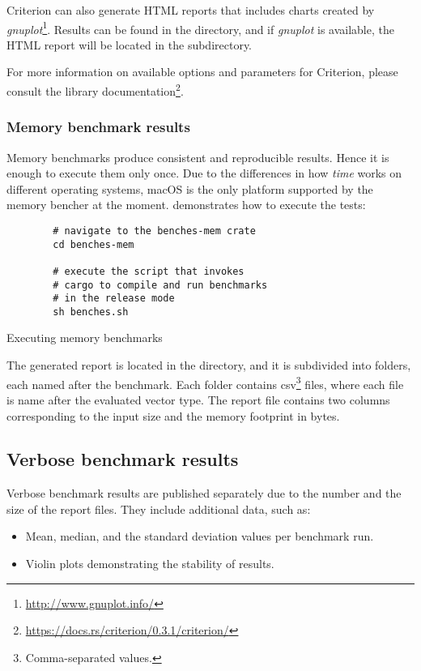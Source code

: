 Criterion can also generate HTML reports that includes charts created by \emph{gnuplot}\footnote{\url{http://www.gnuplot.info/}}. Results can be found in the  directory, and if \emph{gnuplot} is available, the HTML report will be located in the  subdirectory.

For more information on available options and parameters for Criterion, please consult the library documentation\footnote{\url{https://docs.rs/criterion/0.3.1/criterion/}}.

\subsubsection*{Memory benchmark results}
Memory benchmarks produce consistent and reproducible results. Hence it is enough to execute them only once. Due to the differences in how \emph{time} works on different operating systems, macOS is the only platform supported by the memory bencher at the moment.  demonstrates how to execute the tests:

\begin{listing}[!htbp]

    \centering
    \begin{verbatim}
        # navigate to the benches-mem crate
        cd benches-mem

        # execute the script that invokes
        # cargo to compile and run benchmarks
        # in the release mode
        sh benches.sh
    \end{verbatim}

    \caption{Executing memory benchmarks}
    \label{lst:memory-benches}
\end{listing}

The generated report is located in the  directory, and it is subdivided into folders, each named after the benchmark. Each folder contains csv\footnote{Comma-separated values.} files, where each file is name after the evaluated vector type. The report file contains two columns corresponding to the input size and the memory footprint in bytes.

\subsection{Verbose benchmark results}
Verbose benchmark results are published separately due to the number and the size of the report files. They include additional data, such as:
\begin{itemize}
    \item Mean, median, and the standard deviation values per benchmark run.
    \item Violin plots demonstrating the stability of results.
\end{itemize}

